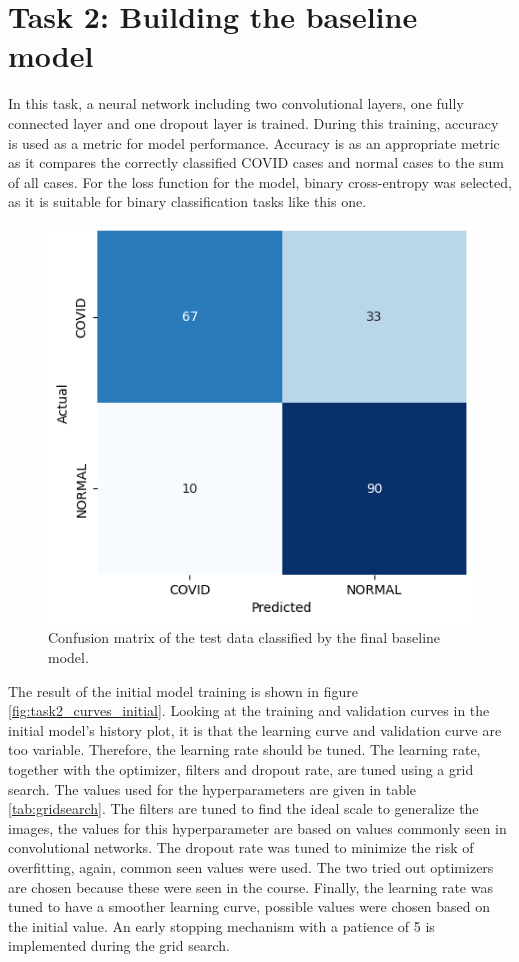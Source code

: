 \documentclass[conference]{IEEEtran}
\begin{document}
\section{Task 2: Building the baseline model}\label{sec:task_2}


In this task, a neural network including two convolutional layers, one fully connected layer and one dropout layer is trained. During this training, accuracy is used as a metric for model performance. Accuracy is as an appropriate metric as it compares the correctly classified COVID cases and normal cases to the sum of all cases.  For the loss function for the model, binary cross-entropy was selected, as it is suitable for binary classification tasks like this one.


\begin{figure}[h!] \centering 						\includegraphics[width=0.9\columnwidth]{fig_task2_confusionmatrix.png} 
	\caption{Confusion matrix of the test data classified by the final baseline model.} 
	\label{fig:task2_confusionmatrix} 
\end{figure}
The result of the initial model training is shown in figure \ref{fig:task2_curves_initial}. Looking at the training and validation curves in the initial model's history plot, it is that the learning curve and validation curve are too variable. Therefore, the learning rate should be tuned. The learning rate, together with the optimizer, filters and dropout rate, are tuned using a grid search. The values used for the hyperparameters are given in table \ref{tab:gridsearch}. The filters are tuned to find the ideal scale to generalize the images, the values for this hyperparameter are based on values commonly seen in convolutional networks. The dropout rate was tuned to minimize the risk of overfitting, again, common seen values were used. The two tried out optimizers are chosen because these were seen in the course. Finally, the learning rate was tuned to have a smoother learning curve, possible values were chosen based on the initial value. An early stopping mechanism with a patience of 5 is implemented during the grid search. 
\end{document}
